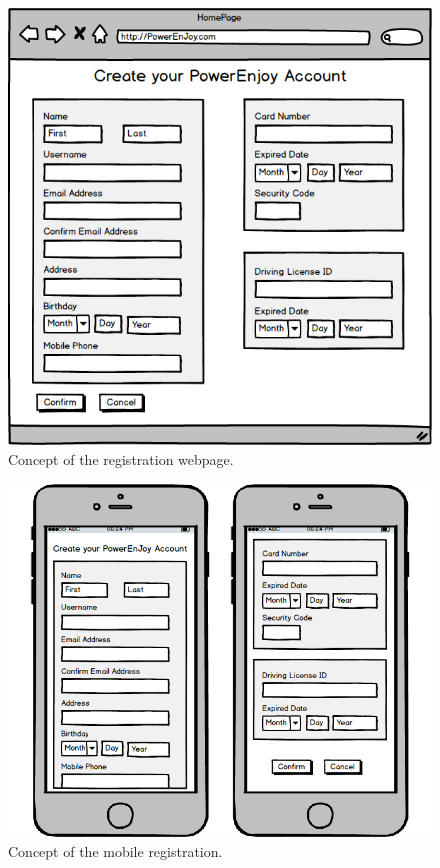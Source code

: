 \begin{figure}[H]
	\includegraphics[width=\textwidth]{mockup/WebRegistration.png}
	\caption{Concept of the registration webpage.}
\end{figure}

\begin{figure}[H]
	\includegraphics[width=\textwidth]{mockup/MobileRegistration.png}
	\caption{Concept of the mobile registration.}
\end{figure}

